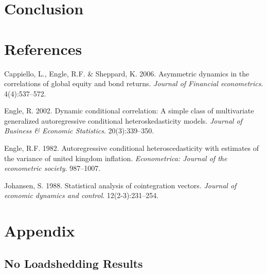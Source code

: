 \documentclass[11pt,preprint, authoryear]{elsarticle}
\numberwithin{equation}{section}
\numberwithin{figure}{section}
\numberwithin{table}{section}
\newlength{\cslhangindent}
\newenvironment{CSLReferences}%
  {\setlength{\parindent}{0pt}%
  \everypar{\setlength{\hangindent}{\cslhangindent}}\ignorespaces}%
  {\par}
\begin{document}
\hfill

\hypertarget{conclusion}{%
\section{Conclusion}\label{conclusion}}

\newpage

\hypertarget{references}{%
\section*{References}\label{references}}

\hypertarget{refs}{}
\begin{CSLReferences}{1}{0}
\leavevmode{}%
Cappiello, L., Engle, R.F. \& Sheppard, K. 2006. Asymmetric dynamics in
the correlations of global equity and bond returns. \emph{Journal of
Financial econometrics}. 4(4):537--572.

\leavevmode{}%
Engle, R. 2002. Dynamic conditional correlation: A simple class of
multivariate generalized autoregressive conditional heteroskedasticity
models. \emph{Journal of Business \& Economic Statistics}.
20(3):339--350.

\leavevmode{}%
Engle, R.F. 1982. Autoregressive conditional heteroscedasticity with
estimates of the variance of united kingdom inflation.
\emph{Econometrica: Journal of the econometric society}. 987--1007.

\leavevmode{}%
Johansen, S. 1988. Statistical analysis of cointegration vectors.
\emph{Journal of economic dynamics and control}. 12(2-3):231--254.

\end{CSLReferences}

\hypertarget{appendix}{%
\section*{Appendix}\label{appendix}}

\hypertarget{no-loadshedding-results}{%
\subsection{No Loadshedding Results}\label{no-loadshedding-results}}
\end{document}
